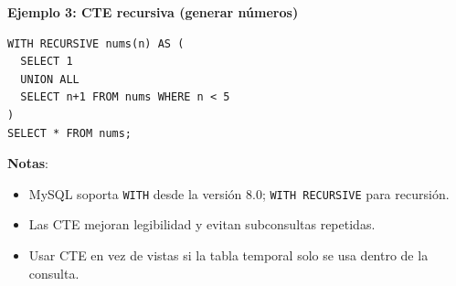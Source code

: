 \documentclass[10pt,a4paper,twocolumn]{article}
\begin{document}
\textbf{Ejemplo 3: CTE recursiva (generar números)}
\begin{lstlisting}
WITH RECURSIVE nums(n) AS (
  SELECT 1
  UNION ALL
  SELECT n+1 FROM nums WHERE n < 5
)
SELECT * FROM nums;
\end{lstlisting}

\textbf{Notas}:
\begin{itemize}
  \item MySQL soporta \texttt{WITH} desde la versión 8.0; \texttt{WITH RECURSIVE} para recursión.
  \item Las CTE mejoran legibilidad y evitan subconsultas repetidas.
  \item Usar CTE en vez de vistas si la tabla temporal solo se usa dentro de la consulta.
\end{itemize}
\end{document}
